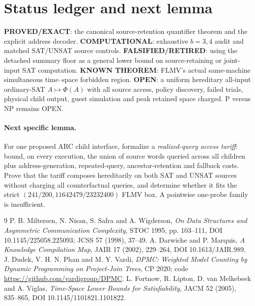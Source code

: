 \documentclass[11pt]{article}
\newcommand{\EXACT}{\textbf{PROVED/EXACT}}
\newcommand{\KNOWN}{\textbf{KNOWN THEOREM}}
\newcommand{\COMP}{\textbf{COMPUTATIONAL}}
\newcommand{\OPEN}{\textbf{OPEN}}
\newcommand{\RET}{\textbf{FALSIFIED/RETIRED}}
\begin{document}
\section{Status ledger and next lemma}
\EXACT: the canonical source-retention quantifier theorem and the explicit
address decoder.  \COMP: exhaustive $b=3,4$ audit and matched SAT/UNSAT source
controls.  \RET: using the detached summary floor as a general lower bound on
source-retaining or joint-input SAT computation.  \KNOWN: FLMV's actual
same-machine simultaneous time--space forbidden region.  \OPEN: a uniform
hereditary all-input ordinary-SAT $A\mapsto\Phi(A)$ with all source access,
policy discovery, failed trials, physical child output, guest simulation and
peak retained space charged.  P versus NP remains OPEN.

\paragraph{Next specific lemma.}
For one proposed ARC child interface, formalize a \emph{realized-query access
tariff}: bound, on every execution, the union of source words queried across
all children plus address-generation, repeated-query, ancestor-retention and
fallback costs.  Prove that the tariff composes hereditarily on both SAT and
UNSAT sources without charging all counterfactual queries, and determine
whether it fits the strict $(241/200,11642479/23232400)$ FLMV box.  A pointwise
one-probe family is insufficient.

\begin{thebibliography}{9}
 P. B. Miltersen, N. Nisan, S. Safra and A. Wigderson,
\emph{On Data Structures and Asymmetric Communication Complexity}, STOC 1995,
pp. 103--111, DOI 10.1145/225058.225093; JCSS 57 (1998), 37--49.
 A. Darwiche and P. Marquis, \emph{A Knowledge Compilation Map},
JAIR 17 (2002), 229--264, DOI 10.1613/JAIR.989.
 J. Dudek, V. H. N. Phan and M. Y. Vardi,
\emph{DPMC: Weighted Model Counting by Dynamic Programming on Project-Join
Trees}, CP 2020; code \url{https://github.com/vardigroup/DPMC}.
 L. Fortnow, R. Lipton, D. van Melkebeek and A. Viglas,
\emph{Time-Space Lower Bounds for Satisfiability}, JACM 52 (2005), 835--865,
DOI 10.1145/1101821.1101822.
\end{thebibliography}
\end{document}
